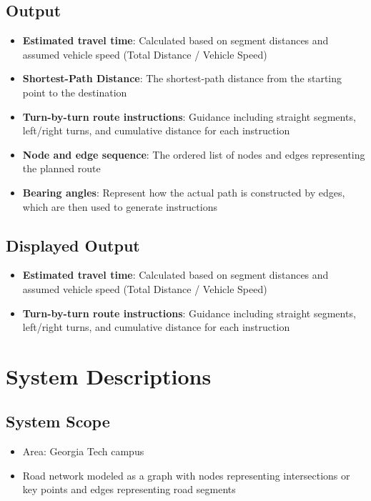 \documentclass[fleqn,10pt]{olplainarticle}
\begin{document}
\subsection*{Output}
\begin{itemize}
    \item \textbf{Estimated travel time}: Calculated based on segment distances and assumed vehicle speed (Total Distance / Vehicle Speed)
    \item \textbf{Shortest-Path Distance}: The shortest-path distance from the starting point to the destination
    \item \textbf{Turn-by-turn route instructions}: Guidance including straight segments, left/right turns, and cumulative distance for each instruction
    \item \textbf{Node and edge sequence}: The ordered list of nodes and edges representing the planned route
    \item \textbf{Bearing angles}: Represent how the actual path is constructed by edges, which are then used to generate instructions
\end{itemize}

\subsection*{Displayed Output}
\begin{itemize}
    \item \textbf{Estimated travel time}: Calculated based on segment distances and assumed vehicle speed (Total Distance / Vehicle Speed)
    \item \textbf{Turn-by-turn route instructions}: Guidance including straight segments, left/right turns, and cumulative distance for each instruction
\end{itemize}

\section*{System Descriptions}
\subsection*{System Scope}
\begin{itemize}
    \item Area: Georgia Tech campus
    \item Road network modeled as a graph with nodes representing intersections or key points and edges representing road segments
\end{itemize}
\end{document}
